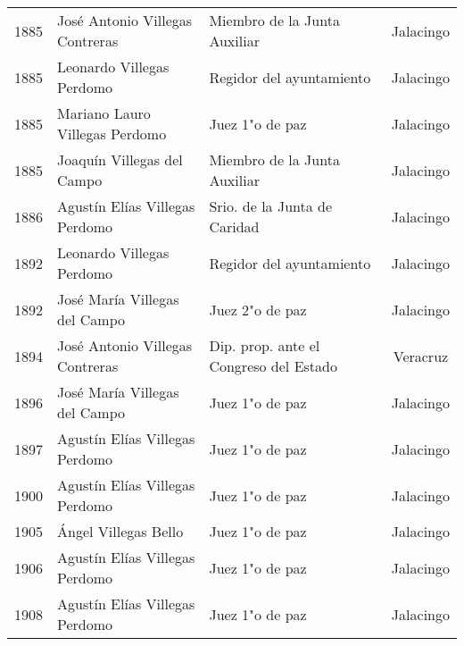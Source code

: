\documentclass[14pt,twoside,final]{extbook} %
\begin{document}
\begin{sidewaystable}
\begin{small}
\begin{tabular}{@{}lllc@{}}
1885 & José Antonio Villegas Contreras\index[nombres]{Villegas Contreras, Jose Antonio@Villegas Contreras, José Antonio!miembro de la Junta Auxiliar} & Miembro de la Junta Auxiliar & Jalacingo \\
1885 & Leonardo Villegas Perdomo\index[nombres]{Villegas Perdomo, Leonardo!regidor del ayuntamiento} & Regidor del ayuntamiento & Jalacingo \\
1885 & Mariano Lauro Villegas Perdomo\index[nombres]{Villegas Perdomo, Mariano Lauro!juez 1.\textsu{o} de paz} & Juez 1"o de paz & Jalacingo \\
1885 & Joaquín Villegas del Campo\index[nombres]{Villegas del Campo, Joaquin@Villegas del Campo, Joaquín!miembro de la Junta Auxiliar} & Miembro de la Junta Auxiliar & Jalacingo \\
1886\capitaldash 1888 & Agustín Elías Villegas Perdomo\index[nombres]{Villegas Perdomo, Agustin Elias@Villegas Perdomo, Agustín Elías!srio. de la Junta de Caridad} & Srio. de la Junta de Caridad & Jalacingo \\
1892 & Leonardo Villegas Perdomo\index[nombres]{Villegas Perdomo, Leonardo!regidor del ayuntamiento} & Regidor del ayuntamiento & Jalacingo \\
1892 & José María Villegas del Campo\index[nombres]{Villegas del Campo, Jose Maria@Villegas del Campo, José María!juez 2.\textsu{o} de paz} & Juez 2"o de paz & Jalacingo \\
1894\capitaldash 1896 & José Antonio Villegas Contreras\index[nombres]{Villegas Contreras, Jose Antonio@Villegas Contreras, José Antonio!diputado en el congreso local} & Dip. prop. ante el Congreso del Estado & Veracruz \\
1896 & José María Villegas del Campo\index[nombres]{Villegas del Campo, Jose Maria@Villegas del Campo, José María!juez 1.\textsu{o} de paz} & Juez 1"o de paz & Jalacingo \\
1897 & Agustín Elías Villegas Perdomo\index[nombres]{Villegas Perdomo, Agustin Elias@Villegas Perdomo, Agustín Elías!juez 1.\textsu{o} de paz} & Juez 1"o de paz & Jalacingo \\
1900 & Agustín Elías Villegas Perdomo & Juez 1"o de paz & Jalacingo \\
1905 & Ángel Villegas Bello\index[nombres]{Villegas Bello, Angel@Villegas Bello, Ángel!juez 1.\textsu{o} de paz} & Juez 1"o de paz & Jalacingo \\
1906 & Agustín Elías Villegas Perdomo & Juez 1"o de paz & Jalacingo \\
1908 & Agustín Elías Villegas Perdomo & Juez 1"o de paz & Jalacingo \\

\end{tabular}
\end{small}
\end{sidewaystable}
\end{document}
